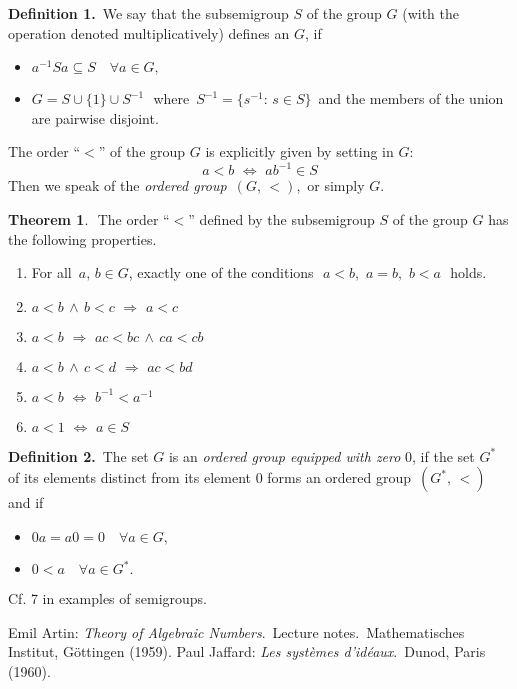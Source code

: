 \documentclass[12pt]{article}
\theoremstyle{definition}
\newtheorem{thmplain}{Theorem}
\begin{document}
\textbf{Definition 1.}\, We say that the subsemigroup $S$ of the group $G$ (with the operation denoted multiplicatively) defines an  $G$, if 
\begin{itemize}
 \item $a^{-1}Sa \subseteq S \quad \forall a\in G,$
 \item $G = S\cup \{1\} \cup S^{-1}$\,\, where \,$S^{-1} = \{s^{-1}: \,s\in S\}$\, and the members of the union are pairwise disjoint.
\end{itemize}


The order ``$<$'' of the group $G$ is explicitly given by setting in $G$:
$$a < b \,\, \Leftrightarrow \,\,ab^{-1}\in S$$
Then we speak of the {\em ordered group}\, $(G,\,<)$,\, or simply $G$.\\

\begin{thmplain}
\,\,The order ``$<$'' defined by the subsemigroup $S$ of the group $G$ has the following properties.
\begin{enumerate}
 \item For all\, $a,\,b\in G$, exactly one of the conditions\,\, $a < b,\,\,a = b,\,\,b < a$\,\, holds.
 \item $a < b \,\land\, b < c \,\,\Rightarrow\,\,a < c$
 \item $a < b \,\,\Rightarrow\,\, ac < bc \,\land\, ca < cb$ 
 \item $a < b \,\land\, c < d \,\,\Rightarrow\,\, ac < bd$
 \item $a < b \,\,\Leftrightarrow\,\, b^{-1} < a^{-1}$
 \item $a < 1 \,\,\Leftrightarrow\,\, a\in S$
\end{enumerate}
\end{thmplain}


\textbf{Definition 2.}\, The set $G$ is an {\em ordered group equipped with zero} 0, if the set $G^*$ of its elements distinct from its element 0 forms an ordered group\, $(G^*,\,<)$\, and if
\begin{itemize}
 \item $0a = a0 = 0 \quad\forall a\in G,$
 \item $0 < a \quad\forall a\in G^*.$
\end{itemize}

Cf. 7 in examples of semigroups.

\begin{thebibliography}{9}
 {\sc Emil Artin}: {\em Theory of Algebraic Numbers}.\, Lecture notes. \,Mathematisches Institut, G\"ottingen (1959).
 {\sc Paul Jaffard}: {\em Les syst\`emes d'id\'eaux}.\, Dunod, Paris (1960).
\end{thebibliography}
\end{document}
